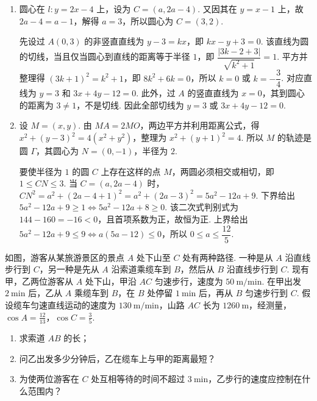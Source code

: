 \begin{solution}
\begin{enumerate}
\item 圆心在 \(l:y=2x-4\) 上，设为 \(C=(a,2a-4)\). 又因其在 \(y=x-1\) 上，故 \(2a-4=a-1\)，解得 \(a=3\)，所以圆心为 \(C=(3,2)\).

先设过 \(A(0,3)\) 的非竖直直线为 \(y-3=kx\)，即 \(kx-y+3=0\). 该直线为圆的切线，当且仅当圆心到直线的距离等于半径 \(1\)，即
\(\dfrac{|3k-2+3|}{\sqrt{k^2+1}}=1\). 平方并整理得 \((3k+1)^2=k^2+1\)，即 \(8k^2+6k=0\)，所以 \(k=0\) 或 \(k=-\dfrac34\). 对应直线为 \(y=3\) 和 \(3x+4y-12=0\). 此外，过 \(A\) 的竖直直线为 \(x=0\)，其到圆心的距离为 \(3\ne1\)，不是切线. 因此全部切线为 \(y=3\) 或 \(3x+4y-12=0\).

\item 设 \(M=(x,y)\). 由 \(MA=2MO\)，两边平方并利用距离公式，得
\(x^2+(y-3)^2=4(x^2+y^2)\)，整理为 \(x^2+(y+1)^2=4\). 所以 \(M\) 的轨迹是圆 \(\Gamma\)，其圆心为 \(N=(0,-1)\)，半径为 \(2\).

要使半径为 \(1\) 的圆 \(C\) 上存在这样的点 \(M\)，两圆必须相交或相切，即
\(1\leqslant CN\leqslant3\). 当 \(C=(a,2a-4)\) 时，
\(CN^2=a^2+(2a-4+1)^2=a^2+(2a-3)^2=5a^2-12a+9\). 下界给出
\(5a^2-12a+9\geqslant1\iff5a^2-12a+8\geqslant0\). 该二次式判别式为 \(144-160=-16<0\)，且首项系数为正，故恒为正. 上界给出
\(5a^2-12a+9\leqslant9\iff a(5a-12)\leqslant0\)，所以 \(0\leqslant a\leqslant\dfrac{12}{5}\).
\end{enumerate}
\end{solution}

\begin{problem}
如图，游客从某旅游景区的景点 \(A\) 处下山至 \(C\) 处有两种路径. 一种是从 \(A\) 沿直线步行到 \(C\)，另一种是先从 \(A\) 沿索道乘缆车到 \(B\)，然后从 \(B\) 沿直线步行到 \(C\). 现有甲，乙两位游客从 \(A\) 处下山，甲沿 \(AC\) 匀速步行，速度为 \(50\mathrm{~m/min}\). 在甲出发 \(2\mathrm{~min}\) 后，乙从 \(A\) 乘缆车到 \(B\)，在 \(B\) 处停留 \(1\mathrm{~min}\) 后，再从 \(B\) 匀速步行到 \(C\). 假设缆车匀速直线运动的速度为 \(130\mathrm{~m/min}\)，山路 \(AC\) 长为 \(1260\mathrm{~m}\)，经测量，\(\cos A=\frac{12}{13}\)，\(\cos C=\frac{3}{5}\).

\begin{enumerate}
\item 求索道 \(AB\) 的长；
\item 问乙出发多少分钟后，乙在缆车上与甲的距离最短？
\item 为使两位游客在 \(C\) 处互相等待的时间不超过 \(3\mathrm{~min}\)，乙步行的速度应控制在什么范围内？
\end{enumerate}

\end{problem}

